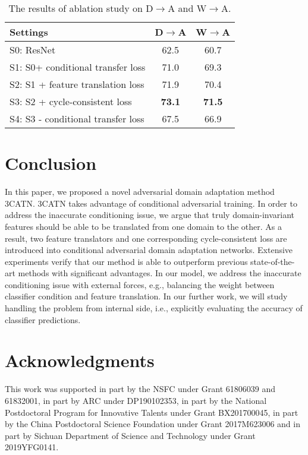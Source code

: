 \documentclass[sigconf]{acmart}
\begin{document}
\begin{table}[t!p]
\centering
\caption{The results of ablation study on D$\rightarrow$A and W$\rightarrow$A. }
\vspace{-5pt}
\label{tab:ablation}
\small \begin{tabular}{lcc}
\toprule
Settings & D$\rightarrow$A & W$\rightarrow$A  \\
\midrule
S0: ResNet  & 62.5 & 60.7   \\
S1: S0+ conditional transfer loss    & 71.0 & 69.3   \\
S2: S1 + feature translation loss & 71.9 & 70.4   \\
S3: S2 + cycle-consistent loss  & {\bf 73.1} & {\bf 71.5}  \\     
S4: S3 - conditional transfer loss   & 67.5 & 66.9  \\     
\bottomrule
\end{tabular}
\vspace{-10pt}
\end{table}

\section{Conclusion}
In this paper, we proposed a novel adversarial domain adaptation method 3CATN. 3CATN takes advantage of conditional adversarial training. In order to address the inaccurate conditioning issue, we argue that truly domain-invariant features should be able to be translated from one domain to the other. As a result, two feature translators and one corresponding cycle-consistent loss are introduced into conditional adversarial domain adaptation networks. Extensive experiments verify that our method is able to outperform previous state-of-the-art methods with significant advantages. In our model, we address the inaccurate conditioning issue with external forces, e.g., balancing the weight between classifier condition and feature translation. In our further work, we will study handling the problem from internal side, i.e., explicitly evaluating the accuracy of classifier predictions.

\section{Acknowledgments}
This work was supported in part by the NSFC under Grant 61806039 and 61832001, in part by ARC under DP190102353, in part by the National Postdoctoral Program for Innovative Talents under Grant BX201700045, in part by the China Postdoctoral Science Foundation under Grant 2017M623006 and in part by Sichuan Department of Science and Technology under Grant 2019YFG0141.



\balance


\end{document}
